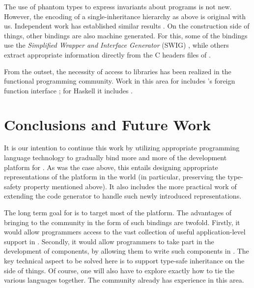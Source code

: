 \documentclass[finalversion]{usetex-v1}
\begin{document}
The use of phantom types to express invariants about programs
is not new. However, the encoding of a single-inheritance hierarchy as
above is original with us. Independent work has established similar results
\cite{Fluet-Pucella:2002}. %
On the construction side of things, other bindings are also machine
generated. For this, some of the bindings use the \emph{Simplified
  Wrapper and Interface Generator} (SWIG)
\cite{Beazley:1996}, while others
extract appropriate information directly from the C headers files of
\gtk.

From the outset, the necessity of access to libraries has been realized
in the functional programming community. Work in this area for \sml
includes
\smlnj's foreign function interface \cite{Blume:2001:nlffi};
for Haskell it includes \cite{Finne:1999:CallingHellFromHeaven}.



\section{Conclusions and Future Work}
\label{sec:conclusion}

It is our intention to continue this work by utilizing appropriate
programming language technology to gradually bind more and more of the
\gnome development platform for \sml. As was the case above, this
entails designing appropriate representations of the platform in the
\sml world (in particular, preserving the type-safety property mentioned
above). It also includes the more practical work of extending the code
generator to handle such newly introduced representations.

The long term goal for \mgtk is to target most of the \gnome{}
platform.  The advantages of bringing \gnome to the \sml community in
the form of such bindings are twofold. Firstly, it would allow \sml
programmers access to the vast collection of useful application-level
support in \gnome. Secondly, it would allow \sml programmers to take part in
the development of \gnome components, by allowing them to write such
components in \sml. The key technical aspect to be solved here is to
support type-safe inheritance on the \sml side of things. Of course,
one will also have to explore exactly how to tie the various languages
together.  The \gnome community already has experience in this area.

\end{document}
